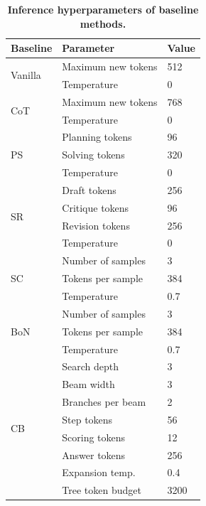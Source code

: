 \begin{table}[!t]
\centering
\caption{\textbf{Inference hyperparameters of baseline methods.}}
\vspace{-2mm}
\label{tab:app_hparam_baseline}
\footnotesize
\setlength{\tabcolsep}{6pt} 
\renewcommand{\arraystretch}{0.93} 

\begin{minipage}[t]{0.49\textwidth}
\centering
\begin{tabular}{lll}
\toprule
\textbf{Baseline} & \textbf{Parameter} & \textbf{Value} \\
\midrule

\multirow{2}{*}{Vanilla}
& Maximum new tokens & 512 \\
& Temperature & 0 \\
\midrule

\multirow{2}{*}{CoT}
& Maximum new tokens & 768 \\
& Temperature & 0 \\
\midrule

\multirow{3}{*}{PS}
& Planning tokens & 96 \\
& Solving tokens & 320 \\
& Temperature & 0 \\
\midrule

\multirow{4}{*}{SR}
& Draft tokens & 256 \\
& Critique tokens & 96 \\
& Revision tokens & 256 \\
& Temperature & 0 \\
\midrule

\multirow{3}{*}{SC}
& Number of samples & 3 \\
& Tokens per sample & 384 \\
& Temperature & 0.7 \\
\midrule

\multirow{3}{*}{BoN}
& Number of samples & 3 \\
& Tokens per sample & 384 \\
& Temperature & 0.7 \\
\midrule

\multirow{8}{*}{CB}
& Search depth & 3 \\
& Beam width & 3 \\
& Branches per beam & 2 \\
& Step tokens & 56 \\
& Scoring tokens & 12 \\
& Answer tokens & 256 \\
& Expansion temp. & 0.4 \\
& Tree token budget & 3200 \\
\midrule


\end{tabular}
\end{minipage}
\end{table}
